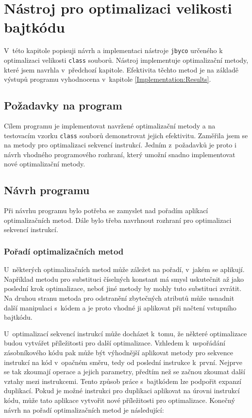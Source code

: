 \chapter{Nástroj pro optimalizaci velikosti bajtkódu}\label{Implementation}


V~této kapitole popisuji návrh a implementaci nástroje \texttt{jbyco} určeného k optimalizaci velikosti \texttt{class} souborů. Nástroj implementuje optimalizační metody, které jsem navrhla v~předchozí kapitole. Efektivita těchto metod je na základě výstupů programu vyhodnocena v~kapitole \ref{Implementation:Results}.

\section{Požadavky na program}

Cílem programu je implementovat navržené optimalizační metody a na testovacím vzorku \texttt{class} souborů demonstrovat jejich efektivitu. Zaměřila jsem se na metody pro optimalizaci sekvencí instrukcí. Jedním z~požadavků je proto i návrh vhodného programového rozhraní, který umožní snadno implementovat nové optimalizační metody.

\section{Návrh programu}

Při návrhu programu bylo potřeba se zamyslet nad pořadím aplikací optimalizačních metod. Dále bylo třeba navrhnout rozhraní pro optimalizaci sekvencí instrukcí.

\subsection{Pořadí optimalizačních metod}

U~některých optimalizačních metod může záležet na pořadí, v~jakém se aplikují. Například metodu pro substituci číselných konstant má smysl uskutečnit až jako poslední krok optimalizace, neboť jiné metody by mohly tuto substituci zvrátit. Na druhou stranu metoda pro odstranění zbytečných atributů může usnadnit další manipulaci s~kódem a je proto vhodné ji aplikovat při načtení vstupního bajtkódu. 

U~optimalizací sekvencí instrukcí může docházet k~tomu, že některé optimalizace budou vytvářet příležitosti pro další optimalizace. Vzhledem k~uspořádání zásobníkového kódu pak může být výhodnější aplikovat metody pro sekvence instrukcí na kód v~opačném směru, tedy od poslední instrukce k~první. Nejprve se tak zkoumají operace a jejich parametry, předtím než se začnou zkoumat další vztahy mezi instrukcemi. Tento způsob práce s~bajtkódem lze podpořit expanzí duplikací. Pokud je možné instrukci pro duplikaci aplikovat na úrovni instrukcí kódu, může tato aplikace vytvořit nové příležitosti pro optimalizace.
Konečný návrh na pořadí optimalizačních metod je následující:

